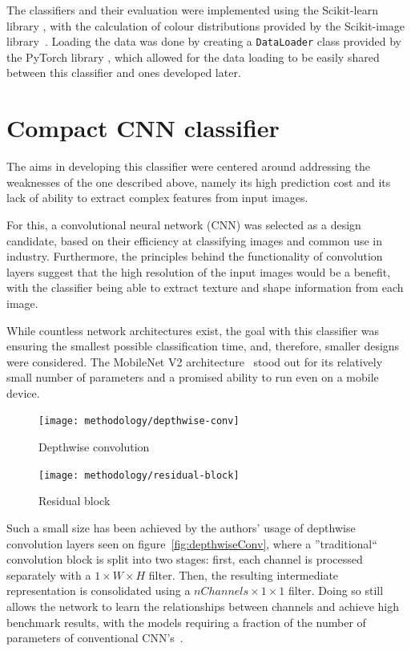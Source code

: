 The classifiers and their evaluation were implemented using the Scikit-learn library \cite{sklearnLibrary}, with the calculation of colour
distributions provided by the Scikit-image library~\cite{skImageLibrary}.
Loading the data was done by creating a \verb|DataLoader| class provided by the PyTorch library \cite{pytorchLibrary}, which allowed
for the data loading to be easily shared between this classifier and ones developed later.


\section{Compact CNN classifier}
\label{sec:deep-learning}
The aims in developing this classifier were centered around addressing the weaknesses of the one described above,
namely its high prediction cost and its lack of ability to extract complex features from input images.

For this, a convolutional neural network (CNN) was selected as a design candidate, based on their
efficiency at classifying images and common use in industry.
Furthermore, the principles behind the functionality of convolution layers suggest that the high resolution of the input
images would be a benefit, with the classifier being able to extract texture and shape information from each image.

While countless network architectures exist, the goal with this classifier was ensuring the smallest possible classification time,
and, therefore, smaller designs were considered.
The MobileNet V2 architecture~\cite{mobileNet} stood out for its relatively small number of parameters and a promised ability to run even on
a mobile device.

\begin{figure}
    \centering
    \texttt{[image: methodology/depthwise-conv]}
    \caption[Depthwise convolution]{Depthwise convolution~\cite{mobileNet}}
    \label{fig:depthwiseConv}
    \vspace{0.5em}
    \texttt{[image: methodology/residual-block]}
    \caption[Residual block]{Residual block~\cite{resNet}}
    \label{fig:residualBlock}
    \vspace{-1em}
\end{figure}

Such a small size has been achieved by the authors' usage of depthwise convolution layers seen on figure~\ref{fig:depthwiseConv},
where a ''traditional`` convolution block is split into two stages: first, each channel is processed separately with a $1 \times W \times H$ filter.
Then, the resulting intermediate representation is consolidated using a $nChannels \times 1 \times 1$ filter.
Doing so still allows the network to learn the relationships between channels and achieve high benchmark results, with the models requiring
a fraction of the number of parameters of conventional CNN's~\cite{mobileNet}.

